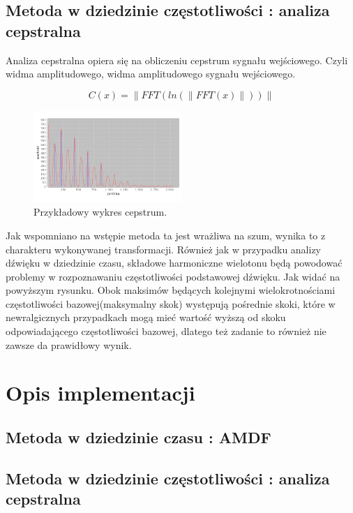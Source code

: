 \documentclass{classrep}
\begin{document}
\subsection{Metoda w dziedzinie częstotliwości : analiza cepstralna}

Analiza cepstralna opiera się na obliczeniu cepstrum sygnału wejściowego. Czyli widma amplitudowego, widma amplitudowego sygnału wejściowego.

\begin{equation}
C(x) =\| FFT \left( ln \left( \| FFT(x) \| \right) \right) \|
\end{equation}


\begin{figure}[H]
  \centering
  \includegraphics[width=0.5\textwidth]{cepstrum}
  \caption{Przykładowy wykres cepstrum.}
  \label{fig_cepstrum}
\end{figure}

Jak wspomniano na wstępie metoda ta jest wrażliwa na szum, wynika to z charakteru wykonywanej transformacji. Również jak w przypadku analizy dźwięku w dziedzinie czasu, składowe harmoniczne wielotonu będą powodować problemy w rozpoznawaniu częstotliwości podstawowej dźwięku. Jak widać na powyższym rysunku. Obok maksimów będących kolejnymi wielokrotnościami częstotliwości bazowej(maksymalny skok) występują pośrednie skoki, które w newralgicznych przypadkach mogą mieć wartość wyższą od skoku odpowiadającego częstotliwości bazowej, dlatego też zadanie to również nie zawsze da prawidłowy wynik. 


\section{Opis implementacji}


\subsection{Metoda w dziedzinie czasu : AMDF}

\subsection{Metoda w dziedzinie częstotliwości : analiza cepstralna}
\end{document}
